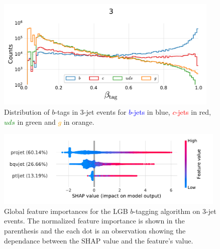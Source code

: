 \begin{figure}[h!]
    \centerfloat
    \includegraphics[width=0.95\textwidth, trim=15 15 15 50, clip]{figures/quarks/btag_scores_histogram_-njet=3-down_sample=1.00-ML_vars=vertex-selection=b-ejet_min=4-n_iter_RS_lgb=99-n_iter_RS_xgb=9-cdot_cut=0.90-version=19.pdf}
    \caption[Distribution of $b$-Tags in 3-Jet Events]
            {Distribution of $b$-tags in 3-jet events for \textcolor{blue}{$b$-jets} in blue, \textcolor{red}{$c$-jets} in red, \textcolor{green}{$uds$} in green and \textcolor{orange}{$g$} in orange.} 
    \label{fig:q:btag_histogram_3j}
  \end{figure}
  



\begin{figure}[h!]
  \includegraphics[width=0.98\textwidth, trim=10 10 20 10, clip]{figures/quarks/shap_global-down_sample=1.00-ML_vars=vertex-selection=b-ejet_min=4-n_iter_RS_lgb=99-n_iter_RS_xgb=9-cdot_cut=0.90-version=19-njet=3.pdf}
  \caption[Global Feature Importances for the LGB $b$-Tagging Algorithm on 3-Jet Events]
          {Global feature importances for the LGB $b$-tagging algorithm on 3-jet events. The normalized feature importance is shown in the parenthesis and the each dot is an observation showing the dependance between the SHAP value and the feature's value. 
          } 
  \label{fig:q:shap_btag_global_3j}
\end{figure}

\newpage
\FloatBarrier


